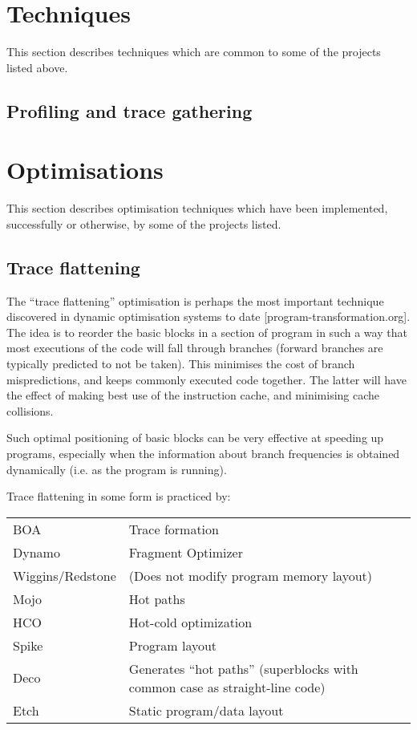 \section{Techniques}

This section describes techniques which are common to some of the projects listed above.

\subsection{Profiling and trace gathering}

\section{Optimisations}

This section describes optimisation techniques which have been implemented, successfully or otherwise, by some of the projects listed.

\subsection{Trace flattening}

The ``trace flattening'' optimisation is perhaps the most important technique discovered in dynamic optimisation systems to date [program-transformation.org]. The idea is to reorder the basic blocks in a section of program in such a way that most executions of the code will fall through branches (forward branches are typically predicted to not be taken). This minimises the cost of branch mispredictions, and keeps commonly executed code together. The latter will have the effect of making best use of the instruction cache, and minimising cache collisions.

Such optimal positioning of basic blocks can be very effective at speeding up programs, especially when the information about branch frequencies is obtained dynamically (i.e. as the program is running).

Trace flattening in some form is practiced by:

\newcommand{\multinamedstart}{
\begin{center}
\begin{tabular}[b]{|l|p{9cm}|}
\hline}

\newcommand{\multinamedend}{
\hline
\end{tabular}
\end{center}}

\multinamedstart
BOA & Trace formation \\
Dynamo & Fragment Optimizer \\
Wiggins/Redstone & (Does not modify program memory layout) \\
Mojo & Hot paths \\
HCO & Hot-cold optimization \\
Spike & Program layout \\
Deco & Generates ``hot paths'' (superblocks with common case as straight-line code) \\
Etch & Static program/data layout \\
\multinamedend

